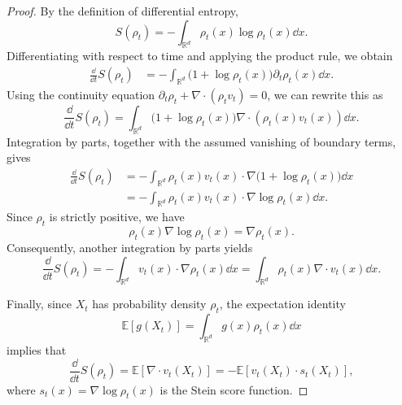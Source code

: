 \documentclass[12pt,a4paper,oneside]{book}
\begin{document}
\begin{proof}
By the definition of differential entropy,
\begin{equation*}
    S(\rho_t)
    =-\int_{\mathbb R^d}\rho_t(x)\log\rho_t(x)\dd x.
\end{equation*}
Differentiating with respect to time and applying the product rule, we obtain
\begin{equation*}
    \begin{aligned}
        \frac{\dd}{\dd t}S(\rho_t)
        &=-\int_{\mathbb R^d}
        \bigl(1+\log\rho_t(x)\bigr)
        \partial_t\rho_t(x)\dd x.
    \end{aligned}
\end{equation*}
Using the continuity equation $\partial_t\rho_t+\nabla\cdot(\rho_t v_t)=0$, we can rewrite this as
\begin{equation*}
    \frac{\dd}{\dd t}S(\rho_t) = \int_{\mathbb R^d}
        \bigl(1+\log\rho_t(x)\bigr) \nabla\cdot(\rho_t(x)v_t(x))\dd x.
\end{equation*}
Integration by parts, together with the assumed vanishing of boundary terms, gives
\begin{equation*}
    \begin{aligned}
        \frac{\dd}{\dd t}S(\rho_t)
        &=-\int_{\mathbb R^d} \rho_t(x)v_t(x)\cdot \nabla\bigl(1+\log\rho_t(x)\bigr)\dd x\\
        &=-\int_{\mathbb R^d} \rho_t(x)v_t(x)\cdot \nabla\log\rho_t(x)\dd x.
    \end{aligned}
\end{equation*}
Since $\rho_t$ is strictly positive, we have
\begin{equation*}
    \rho_t(x)\nabla\log\rho_t(x)=\nabla\rho_t(x).
\end{equation*}
Consequently, another integration by parts yields
\begin{equation*}
    \frac{\dd}{\dd t}S(\rho_t) 
    = -\int_{\mathbb R^d} v_t(x)\cdot\nabla\rho_t(x)\dd x
    = \int_{\mathbb R^d} \rho_t(x)\nabla\cdot v_t(x)\dd x.
\end{equation*}

Finally, since $X_t$ has probability density $\rho_t$, the expectation identity
\begin{equation*}
    \mathbb E[g(X_t)]
    =\int_{\mathbb R^d}g(x)\rho_t(x)\dd x
\end{equation*}
implies that
\begin{equation*}
    \frac{\dd}{\dd t}S(\rho_t) =\mathbb E[\nabla\cdot v_t(X_t)] = -\mathbb E[v_t(X_t)\cdot s_t(X_t)],
\end{equation*}
where $s_t(x)=\nabla\log\rho_t(x)$ is the Stein score function.
\end{proof}
\end{document}
